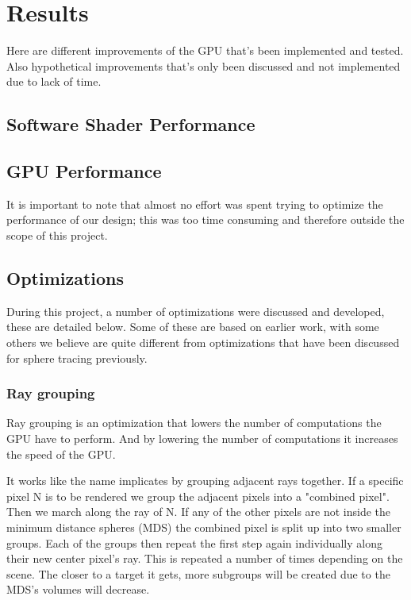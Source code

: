 \chapter{Results}

	Here are different improvements of the GPU that's been implemented and tested.
	Also hypothetical improvements that's only been discussed and not
	implemented due to lack of time.  

	\section{Software Shader Performance}

	\section{GPU Performance}
		
		It is important to note that almost no effort was spent trying to
		optimize the performance of our design; this was too time consuming and
		therefore outside the scope of this project.

	\section{Optimizations}
		
		During this project, a number of optimizations were discussed and 
		developed, these are detailed below. Some of these are based on earlier
		work, with some others we believe are quite different from optimizations
		that have been discussed for sphere tracing previously.

		\subsection{Ray grouping}
		
			Ray grouping is an optimization that lowers the number of
			computations the GPU have to perform. And by lowering the number of
			computations it increases the speed of the GPU.
			
			It works like the name implicates by grouping adjacent rays
			together.  If a specific pixel N is to be rendered we group the
			adjacent pixels into a "combined pixel". Then we march along the
			ray of N. If any of the other pixels are not inside the minimum
			distance spheres (MDS) the combined pixel is split up into two
			smaller groups. Each of the groups then repeat the first step again
			individually along their new center pixel's ray. This is repeated a
			number of times depending on the scene.  The closer to a target it
			gets, more subgroups will be created due to the MDS's volumes will
			decrease.
			
